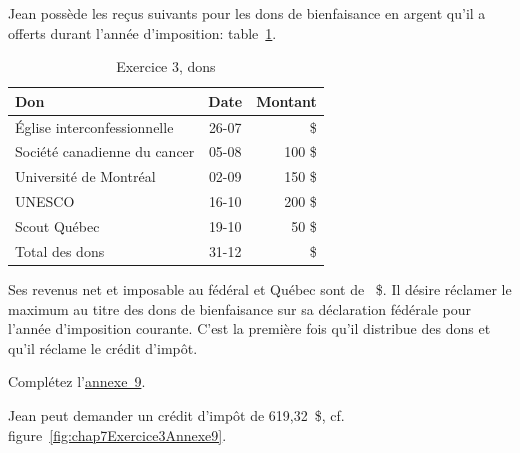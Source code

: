 \begin{question}
	Jean possède les reçus suivants pour les dons de bienfaisance en argent qu'il a offerts durant l'année d'imposition: table~\ref{table:chap7ex3Q5}.
	\begin{table}
		\centering
		\begin{tabular}{lcr}
			\textbf{Don}                 & \textbf{Date} &   \textbf{Montant} \\ \hline\hline
			Église interconfessionnelle  &     26-07     & \numprint{1700} \$ \\ \hline
			Société canadienne du cancer &     05-08     &             100 \$ \\ \hline
			Université de Montréal       &     02-09     &             150 \$ \\ \hline
			UNESCO                       &     16-10     &             200 \$ \\ \hline
			Scout Québec                 &     19-10     &              50 \$ \\ \hline
			Total des dons               &     31-12     & \numprint{2200} \$ \\ \hline
		\end{tabular}
		\caption[]{Exercice 3, dons}
		\label{table:chap7ex3Q5}
	\end{table}
	
	Ses revenus net et imposable au fédéral et Québec sont de ~\$. Il désire réclamer le maximum au titre des dons de bienfaisance sur sa déclaration fédérale pour l'année d'imposition courante. C'est la première fois qu'il distribue des dons et qu'il réclame le crédit d'impôt. 
\end{question}
\setcounter{sousQuestion}{0}
\begin{sousQuestion}
	Complétez l'\href{https://www.canada.ca/fr/agence-revenu/services/formulaires-publications/trousses-impot-toutes-annees-imposition/trousse-generale-impot-prestations/5000-s9.html}{annexe~9}.
\end{sousQuestion}
Jean peut demander un crédit d'impôt de 619,32~\$, cf. figure~\ref{fig:chap7Exercice3Annexe9}.
